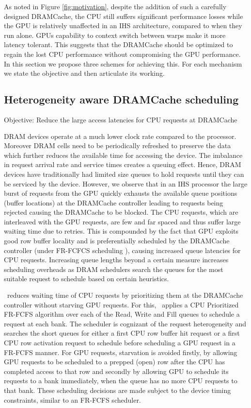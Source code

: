 As noted  in Figure \ref{fig:motivation}, despite the addition of such a carefully designed DRAMCache, the CPU still suffers significant performance losses while the GPU is relatively unaffected in an IHS architecture, compared to when they run alone. GPUs capability to context switch between warps make it more latency tolerant. This suggests that the DRAMCache should be optimized to regain the lost CPU performance without compromising the GPU performance. In this section we propose three schemes for achieving this. For each mechanism we state the objective and then articulate its working.


\subsection{Heterogeneity aware DRAMCache scheduling} 
Objective: Reduce the large access latencies for CPU requests at DRAMCache
\par DRAM devices operate at a much lower clock rate compared to the processor. Moreover DRAM cells need to be periodically refreshed to preserve the data which further reduces the available time for accessing the device. The imbalance in request arrival rate and service times creates a queuing effect. Hence, DRAM devices have traditionally had limited size queues to hold requests until they can be serviced by the device. However, we observe that in an IHS processor the large burst of requests from the GPU quickly exhausts the available queue positions (buffer locations) at the DRAMCache controller leading to requests being rejected causing the DRAMCache to be blocked. 
The CPU requests, which are interleaved with the GPU requests, are few and far spaced and thus suffer large waiting time due to retries. This is compounded by the fact that GPU exploits good row buffer locality and is preferentially scheduled by the DRAMCache controller (under FR-FCFCS scheduling \cite{sms}), causing increased queue latencies for CPU requests. Increasing queue lengths beyond a certain measure increases scheduling overheads as DRAM schedulers search the queues for the most suitable request to schedule based on certain heuristics.
\par \cachename\ reduces waiting time of CPU requests by prioritizing them at the DRAMCache controller without starving GPU requests. 
For this, \cachename\ applies a CPU Prioritized FR-FCFS algorithm over each of the Read, Write and Fill queues to schedule a request at each bank. 
The scheduler is cognizant of the request heterogeneity and searches the short queues for either a first CPU row buffer hit request or a first CPU row activation request to schedule before scheduling a GPU request in a FR-FCFS manner. For GPU requests, starvation is avoided firstly, by allowing GPU requests to be scheduled to a prepped (open) row after the CPU has completed access to that row and secondly by allowing GPU to schedule its requests to a bank immediately, when the queue has no more CPU requests to that bank. These scheduling decisions are made subject to the device timing constraints, similar to an FR-FCFS scheduler.
